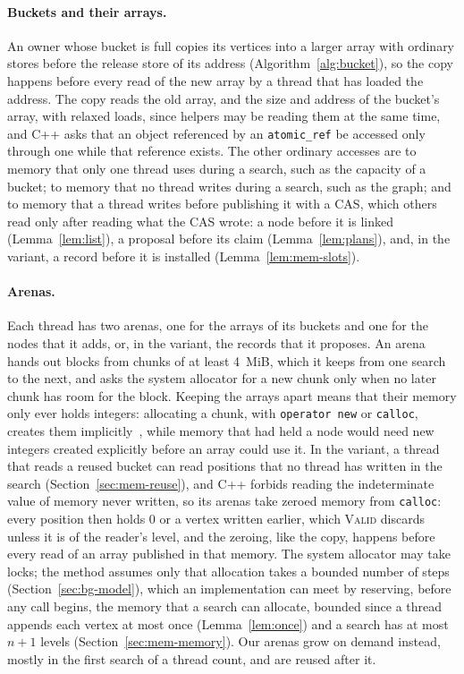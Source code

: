 \paragraph{Buckets and their arrays.} An owner whose bucket is full copies its vertices into a larger array with ordinary stores before the release store of its address (Algorithm~\ref{alg:bucket}), so the copy happens before every read of the new array by a thread that has loaded the address. The copy reads the old array, and the size and address of the bucket's array, with relaxed loads, since helpers may be reading them at the same time, and C++ asks that an object referenced by an \texttt{atomic\_ref} be accessed only through one while that reference exists. The other ordinary accesses are to memory that only one thread uses during a search, such as the capacity of a bucket; to memory that no thread writes during a search, such as the graph; and to memory that a thread writes before publishing it with a CAS, which others read only after reading what the CAS wrote: a node before it is linked (Lemma~\ref{lem:list}), a proposal before its claim (Lemma~\ref{lem:plans}), and, in the variant, a record before it is installed (Lemma~\ref{lem:mem-slots}).

\paragraph{Arenas.} Each thread has two arenas, one for the arrays of its buckets and one for the nodes that it adds, or, in the variant, the records that it proposes. An arena hands out blocks from chunks of at least 4~MiB, which it keeps from one search to the next, and asks the system allocator for a new chunk only when no later chunk has room for the block. Keeping the arrays apart means that their memory only ever holds integers: allocating a chunk, with \texttt{operator new} or \texttt{calloc}, creates them implicitly~\cite{cppstd}, while memory that had held a node would need new integers created explicitly before an array could use it. In the variant, a thread that reads a reused bucket can read positions that no thread has written in the search (Section~\ref{sec:mem-reuse}), and C++ forbids reading the indeterminate value of memory never written, so its arenas take zeroed memory from \texttt{calloc}: every position then holds 0 or a vertex written earlier, which \textsc{Valid} discards unless it is of the reader's level, and the zeroing, like the copy, happens before every read of an array published in that memory. The system allocator may take locks; the method assumes only that allocation takes a bounded number of steps (Section~\ref{sec:bg-model}), which an implementation can meet by reserving, before any call begins, the memory that a search can allocate, bounded since a thread appends each vertex at most once (Lemma~\ref{lem:once}) and a search has at most $n+1$ levels (Section~\ref{sec:mem-memory}). Our arenas grow on demand instead, mostly in the first search of a thread count, and are reused after it.

